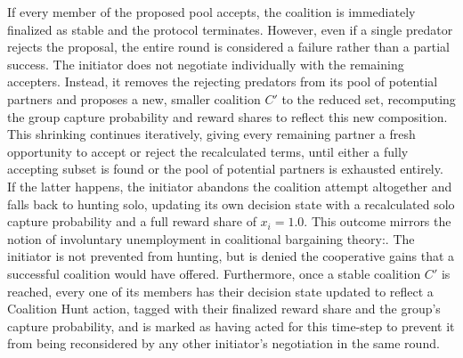\documentclass[12pt,a4paper]{report}
\begin{document}
	If every member of the proposed pool accepts, the coalition is immediately finalized as stable and the protocol terminates. However, even if a single predator rejects the proposal, the entire round is considered a failure rather than a partial success. The initiator does not negotiate individually with the remaining accepters. Instead, it removes the rejecting predators from its pool of potential partners and proposes a new, smaller coalition $C'$ to the reduced set, recomputing the group capture probability and reward shares to reflect this new composition. This shrinking continues iteratively, giving every remaining partner a fresh opportunity to accept or reject the recalculated terms, until either a fully accepting subset is found or the pool of potential partners is exhausted entirely. \\
	
	If the latter happens, the initiator abandons the coalition attempt altogether and falls back to hunting solo, updating its own decision state with a recalculated solo capture probability and a full reward share of $x_i = 1.0$. This outcome mirrors the notion of involuntary unemployment in coalitional bargaining theory:. The initiator is not prevented from hunting, but is denied the cooperative gains that a successful coalition would have offered. Furthermore, once a stable coalition $C'$ is reached, every one of its members has their decision state updated to reflect a Coalition Hunt action, tagged with their finalized reward share and the group's capture probability, and is marked as having acted for this time-step to prevent it from being reconsidered by any other initiator's negotiation in the same round. \\ 
	
\end{document}
